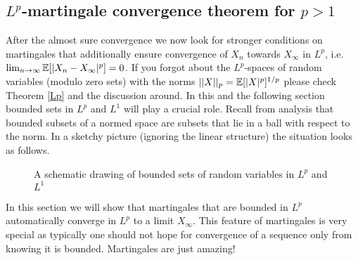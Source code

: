\subsection{$L^p$-martingale convergence theorem for $p>1$}
After the almost sure convergence we now look for stronger conditions on martingales that additionally ensure convergence of $X_n$ towards $X_\infty$ in $L^p$, i.e. $\lim_{n\to\infty}\mathbb{E}[|X_n-X_\infty|^p]=0$. If you forgot about the $L^p$-spaces of random variables (modulo zero sets) with the norms $||X||_p=\mathbb{E}[|X|^p]^{1/p}$ please check Theorem \ref{Lp} and the discussion around. In this and the following section bounded sets in $L^p$ and $L^1$ will play a crucial role. Recall from analysis that bounded subsets of a normed space are subsets that lie in a ball with respect to the norm. In a sketchy picture (ignoring the linear structure) the situation looks as follows. 
\begin{figure}[h]
\begin{center}
  \caption*{A schematic drawing of bounded sets of random variables in $L^p$ and $L^1$}
  \end{center}
\end{figure}
In this section we will show that martingales that are bounded in $L^p$ automatically converge in $L^p$ to a limit $X_\infty$. This feature of martingales is very special as typically one should not hope for convergence of a sequence only from knowing it is bounded. Martingales are just amazing!\smallskip





